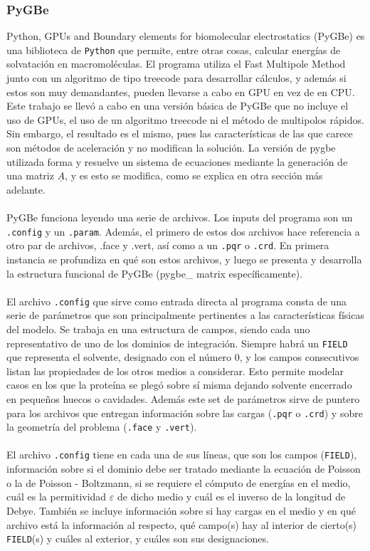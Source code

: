 \documentclass[12pt, notitlepage]{article}
\numberwithin{equation}{section}
\begin{document}
\subsubsection{PyGBe}
Python, GPUs and Boundary elements for biomolecular electrostatics (PyGBe) es una biblioteca de \texttt{Python} que permite, entre otras cosas, calcular energías de solvatación en macromoléculas. El programa utiliza el Fast Multipole Method junto con un algoritmo de tipo treecode para desarrollar cálculos, y además si estos son muy demandantes, pueden llevarse a cabo en GPU en vez de en CPU. Este trabajo se llevó a cabo en una versión básica de PyGBe que no incluye el uso de GPUs, el uso de un algoritmo treecode ni el método de multipolos rápidos. Sin embargo, el resultado es el mismo, pues las características de las que carece son métodos de aceleración y no modifican la solución. La versión de pygbe utilizada forma y resuelve un sistema de ecuaciones mediante la generación de una matriz $\underline{A}$, y es esto se modifica, como se explica en otra sección más adelante.\\\\
PyGBe funciona leyendo una serie de archivos. Los inputs del programa son un \texttt{.config} y un \texttt{.param}. Además, el primero de estos dos archivos hace referencia a otro par de archivos, .face y .vert, así como a un \texttt{.pqr} o \texttt{.crd}. En primera instancia se profundiza en qué son estos archivos, y luego se presenta y desarrolla la estructura funcional de PyGBe (pygbe\_ matrix específicamente).\\\\
El archivo \texttt{.config} que sirve como entrada directa al programa consta de una serie de parámetros que son principalmente pertinentes a las características físicas del modelo. Se trabaja en una estructura de campos, siendo cada uno representativo de uno de los dominios de integración. Siempre habrá un \texttt{FIELD} que representa el solvente, designado con el número 0, y los campos consecutivos listan las propiedades de los otros medios a considerar. Esto permite modelar casos en los que la proteína se plegó sobre sí misma dejando solvente encerrado en pequeños huecos o cavidades. Además este set de parámetros sirve de puntero para los archivos que entregan información sobre las cargas (\texttt{.pqr} o \texttt{.crd}) y sobre la geometría del problema (\texttt{.face} y \texttt{.vert}).\\\\
El archivo \texttt{.config} tiene en cada una de sus líneas, que son los campos (\texttt{FIELD}), información sobre si el dominio debe ser tratado mediante la ecuación de Poisson o la de Poisson - Boltzmann, si se requiere el cómputo de energías en el medio, cuál es la permitividad $\varepsilon$ de dicho medio y cuál es el inverso de la longitud de Debye. También se incluye información sobre si hay cargas en el medio y en qué archivo está la información al respecto, qué campo(s) hay al interior de cierto(s) \texttt{FIELD}(s) y cuáles al exterior, y cuáles son sus designaciones.\\\\
\end{document}
